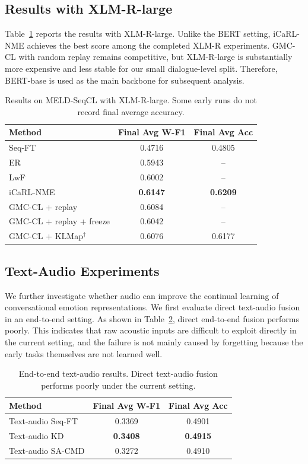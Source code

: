 \subsection{Results with XLM-R-large}
\label{subsec:xlmr_results}

Table~\ref{tab:xlmr_results} reports the results with XLM-R-large. Unlike the BERT setting, iCaRL-NME achieves the best score among the completed XLM-R experiments. GMC-CL with random replay remains competitive, but XLM-R-large is substantially more expensive and less stable for our small dialogue-level split. Therefore, BERT-base is used as the main backbone for subsequent analysis.

\begin{table}[t]
\centering
\caption{Results on MELD-SeqCL with XLM-R-large. Some early runs do not record final average accuracy.}
\label{tab:xlmr_results}
\begin{tabular}{lcc}
\hline
Method & Final Avg W-F1 & Final Avg Acc \\
\hline
Seq-FT & 0.4716 & 0.4805 \\
ER & 0.5943 & -- \\
LwF & 0.6002 & -- \\
iCaRL-NME & \textbf{0.6147} & \textbf{0.6209} \\
GMC-CL + replay & 0.6084 & -- \\
GMC-CL + replay + freeze & 0.6042 & -- \\
GMC-CL + KLMap$^\dagger$ & 0.6076 & 0.6177 \\
\hline
\end{tabular}
\end{table}

\subsection{Text-Audio Experiments}
\label{subsec:text_audio_results}

We further investigate whether audio can improve the continual learning of conversational emotion representations. We first evaluate direct text-audio fusion in an end-to-end setting. As shown in Table~\ref{tab:s5_e2e}, direct end-to-end fusion performs poorly. This indicates that raw acoustic inputs are difficult to exploit directly in the current setting, and the failure is not mainly caused by forgetting because the early tasks themselves are not learned well.

\begin{table}[t]
\centering
\caption{End-to-end text-audio results. Direct text-audio fusion performs poorly under the current setting.}
\label{tab:s5_e2e}
\begin{tabular}{lcc}
\hline
Method & Final Avg W-F1 & Final Avg Acc \\
\hline
Text-audio Seq-FT & 0.3369 & 0.4901 \\
Text-audio KD & \textbf{0.3408} & \textbf{0.4915} \\
Text-audio SA-CMD & 0.3272 & 0.4910 \\
\hline
\end{tabular}
\end{table}

